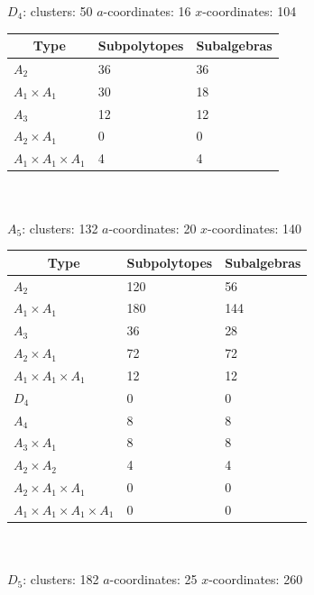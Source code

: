\documentclass[11pt]{article}
\begin{document}
{\Large\underline{\(D_4\)}:} \quad clusters: 50 \qquad \(a\)-coordinates: 16 \qquad \(x\)-coordinates: 104\\

\begin{tabular}{ | l | l | l |}
\multicolumn{1}{c}{Type} &  \multicolumn{1}{c}{Subpolytopes}  &  \multicolumn{1}{c}{Subalgebras} \\
\hline \(A_2\) & 36 & 36 \\ 
\hline \(A_1 \times A_1\) & 30 & 18 \\ \hline 
\hline \(A_3\) & 12 & 12 \\ 
\hline \(A_2 \times A_1\) & 0 & 0 \\ 
\hline \(A_1 \times A_1 \times A_1\) & 4 & 4 \\ 
\hline
\end{tabular} \\ \\

{\Large\underline{\(A_5\)}:} \quad clusters: 132 \qquad \(a\)-coordinates: 20 \qquad \(x\)-coordinates: 140\\

\begin{tabular}{ | l | l | l |}
\multicolumn{1}{c}{Type} &  \multicolumn{1}{c}{Subpolytopes}  &  \multicolumn{1}{c}{Subalgebras} \\
\hline \(A_2\) & 120 & 56 \\ 
\hline \(A_1 \times A_1\) & 180 & 144 \\ \hline 
\hline \(A_3\) & 36 & 28 \\ 
\hline \(A_2 \times A_1\) & 72 & 72 \\ 
\hline \(A_1 \times A_1 \times A_1\) & 12 & 12 \\ \hline 
\hline \(D_4\) & 0 & 0 \\ 
\hline \(A_4\) & 8 & 8 \\ 
\hline \(A_3 \times A_1\) & 8 & 8 \\ 
\hline \(A_2 \times A_2\) & 4 & 4 \\ 
\hline \(A_2 \times A_1 \times A_1\) & 0 & 0 \\ 
\hline \(A_1 \times A_1 \times A_1 \times A_1\) & 0 & 0 \\ 
\hline
\end{tabular} \\ \\


{\Large\underline{\(D_5\)}:} \quad clusters: 182 \qquad \(a\)-coordinates: 25 \qquad \(x\)-coordinates: 260\\
\end{document}
